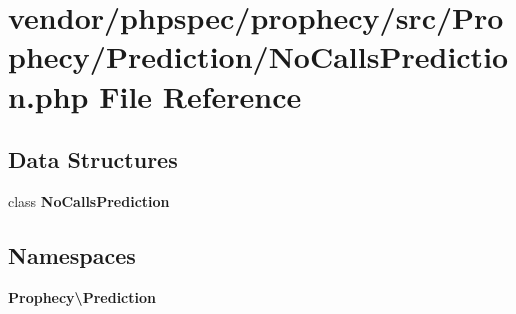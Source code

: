 \section{vendor/phpspec/prophecy/src/\+Prophecy/\+Prediction/\+No\+Calls\+Prediction.php File Reference}
\label{_no_calls_prediction_8php}
\subsection*{Data Structures}
\begin{DoxyCompactItemize}
\item 
class {\bf No\+Calls\+Prediction}
\end{DoxyCompactItemize}
\subsection*{Namespaces}
\begin{DoxyCompactItemize}
\item 
 {\bf Prophecy\textbackslash{}\+Prediction}
\end{DoxyCompactItemize}
